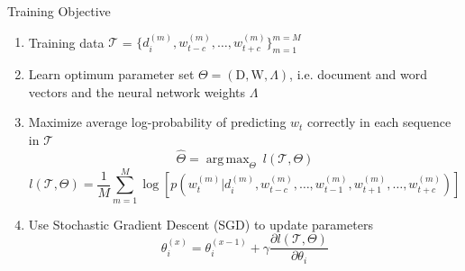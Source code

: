 \documentclass[10pt]{beamer}
\DeclareMathOperator*{\argmax}{arg\,max}
\newcommand{\matD}{\ensuremath{\mathrm{D}} }
\newcommand{\matW}{\ensuremath{\mathrm{W}} }
\newcommand{\traindata}{\ensuremath{\mathcal{T}}}
\begin{document}

\begin{frame}{Training Objective}
\vfill
\begin{enumerate}
	\vfill\item<1-> Training data $\traindata$ = $\{d^{(m)}_{i}, w^{(m)}_{t-c}, \ldots, w^{(m)}_{t+c}\}^{m=M}_{m=1}$
	\vfill\item<2-> Learn optimum parameter set $\Theta = (\matD, \matW, \Lambda)$, i.e. document and word vectors and the neural network weights $\Lambda$ 
	\vfill\item<3-> Maximize average log-probability of predicting $w_{t}$ correctly in each sequence in $\traindata$
					\begin{equation}
						\hat{\Theta} =  \argmax_{\Theta}~l(\traindata, \Theta)
					\end{equation}
					\begin{equation}
						l(\traindata, \Theta) = \frac{1}{M}\sum_{m=1}^{M} \log \left[p(w^{(m)}_{t} | d^{(m)}_{i}, w^{(m)}_{t-c}, \ldots, w^{(m)}_{t-1}, w^{(m)}_{t+1}, \ldots, w^{(m)}_{t+c})\right]
					\end{equation}
	\vfill\item<4-> Use Stochastic Gradient Descent (SGD) to update parameters
					\begin{equation}
						\theta^{(x)}_{i} = \theta^{(x-1)}_{i} + \gamma\frac{\partial l(\traindata, \Theta)}{\partial \theta_{i}}
					\end{equation}
\end{enumerate}
	

\end{frame}

\end{document}
